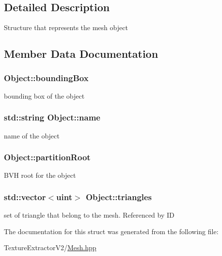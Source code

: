 \subsection{Detailed Description}
Structure that represents the mesh object 

\subsection{Member Data Documentation}
\hypertarget{struct_object_aeeac86f3158968433d8484fb43dc9727}{}
\subsubsection[{bounding\+Box}]{ Object\+::bounding\+Box}\label{struct_object_aeeac86f3158968433d8484fb43dc9727}
bounding box of the object \hypertarget{struct_object_a24457e0a387492c80594aec7681a2277}{}
\subsubsection[{name}]{\setlength{\rightskip}{0pt plus 5cm}std\+::string Object\+::name}\label{struct_object_a24457e0a387492c80594aec7681a2277}
name of the object \hypertarget{struct_object_a484e6471a6620c2dd98aa3db6ab7a9f5}{}
\subsubsection[{partition\+Root}]{ Object\+::partition\+Root}\label{struct_object_a484e6471a6620c2dd98aa3db6ab7a9f5}
B\+V\+H root for the object \hypertarget{struct_object_a4a7a34b417ea8969e1407e6962c671eb}{}
\subsubsection[{triangles}]{\setlength{\rightskip}{0pt plus 5cm}std\+::vector$<$uint$>$ Object\+::triangles}\label{struct_object_a4a7a34b417ea8969e1407e6962c671eb}
set of triangle that belong to the mesh. Referenced by I\+D 

The documentation for this struct was generated from the following file\+:\begin{DoxyCompactItemize}
\item 
Texture\+Extractor\+V2/\hyperlink{_mesh_8hpp}{Mesh.\+hpp}\end{DoxyCompactItemize}
